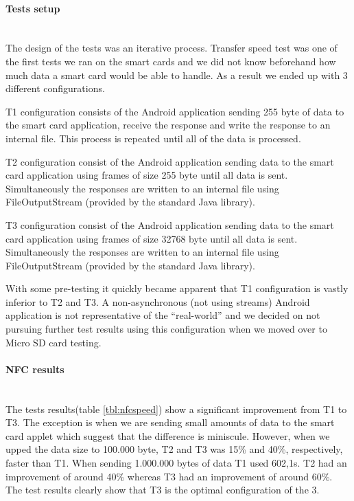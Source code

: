 \paragraph{Tests setup}\mbox{}\\
The design of the tests was an iterative process. Transfer speed test was one of the first tests we ran on the smart cards and we did not know beforehand how much data a smart card would be able to handle. As a result we ended up with 3 different configurations.

T1 configuration consists of the Android application sending 255 byte of data to the smart card application, receive the response and write the response to an internal file. This process is repeated until all of the data is processed.

T2 configuration consist of the Android application sending data to the smart card application using frames of size 255 byte until all data is sent. Simultaneously the responses are written to an internal file using FileOutputStream (provided by the standard Java library).

T3 configuration consist of the Android application sending data to the smart card application using frames of size 32768 byte until all data is sent. Simultaneously the responses are written to an internal file using FileOutputStream (provided by the standard Java library).

With some pre-testing it quickly became apparent that T1 configuration is vastly inferior to T2 and T3. A non-asynchronous (not using streams) Android application is not representative of the ``real-world'' and we decided on not pursuing further test results using this configuration when we moved over to Micro SD card testing.

\paragraph{NFC results}\mbox{}\\



The tests results(table \ref{tbl:nfcspeed}) show a significant improvement from T1 to T3. The exception is when we are sending small amounts of data to the smart card applet which suggest that the difference is miniscule. However, when we upped the data size to 100.000 byte, T2 and T3 was 15\% and 40\%, respectively, faster than T1. When sending 1.000.000 bytes of data T1 used 602,1s. T2 had an improvement of around 40\% whereas T3 had an improvement of around 60\%. The test results clearly show that T3 is the optimal configuration of the 3.

